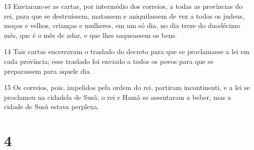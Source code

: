 \par 13 Enviaram-se as cartas, por intermédio dos correios, a todas as províncias do rei, para que se destruíssem, matassem e aniquilassem de vez a todos os judeus, moços e velhos, crianças e mulheres, em um só dia, no dia treze do duodécimo mês, que é o mês de adar, e que lhes saqueassem os bens.
\par 14 Tais cartas encerravam o traslado do decreto para que se proclamasse a lei em cada província; esse traslado foi enviado a todos os povos para que se preparassem para aquele dia.
\par 15 Os correios, pois, impelidos pela ordem do rei, partiram incontinenti, e a lei se proclamou na cidadela de Susã; o rei e Hamã se assentaram a beber, mas a cidade de Susã estava perplexa.

\chapter{4}

